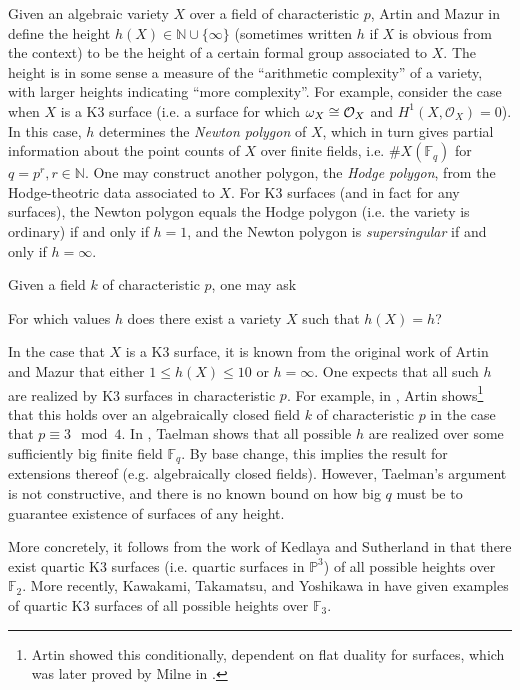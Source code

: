 Given an algebraic variety \(X\) over a field of characteristic \(p\),
Artin and Mazur in \cite{artin-mazur-1977-height}
define the height \(h(X) \in \mathbb{N} \cup \{\infty\}\) 
(sometimes written \(h\) if \(X\) is obvious from the context)
to be the height 
of a certain formal group associated to \(X\).
The height is in some sense a measure of the
``arithmetic complexity'' of a variety,
with larger heights indicating ``more complexity''.
For example, consider the case when \(X\) is a 
K3 surface (i.e. a surface for which \(\omega_{X} \cong \mathcal{O}_{X} \) 
and \(H^{1}(X,\mathcal{O}_{X} ) = 0\)).
In this case, \(h\) determines the \textit{Newton polygon}
of \(X\), which in turn gives partial information about the 
point counts of \(X\) over finite fields,
i.e. \(\#X(\mathbb{F}_{q})\) for \(q = p^{r}, r \in \mathbb{N}\).
One may construct another polygon, the \textit{Hodge polygon},
from the Hodge-theotric data associated to \(X\).
For K3 surfaces (and in fact for any surfaces), 
the Newton polygon equals the Hodge polygon
(i.e. the variety is ordinary) if and only if \(h=1\),
and the Newton polygon is \textit{supersingular} if and only if 
\(h = \infty\).

Given a field \(k\) of characteristic \(p\), one may ask

\begin{quest}
    For which values \(h\) does there exist a variety
    \(X\) such that \(h(X) = h\)?
\end{quest}

In the case that \(X\) is a K3 surface, it is known from the 
original work of Artin and Mazur
that either \(1 \leq h(X) \leq 10\) or \(h = \infty\).
One expects that all such $h$ are realized by K3 surfaces
in characteristic $p$.
For example, in \cite{artin-1974-k3-surfaces},
Artin shows\footnote{
    Artin showed this conditionally, dependent on flat
    duality for surfaces, which was later proved
    by Milne in \cite{milne-1976-flat-duality}.
}
that this holds over an algebraically
closed field \(k\) of characteristic \(p\) in the
case that \(p \equiv 3 \mod 4\).
In \cite{taelman-2016-k3-given-l-function}, 
Taelman shows that
all possible \(h\) are realized
over some sufficiently big finite field \(\mathbb{F}_{q}\). 
By base change, this implies the result for extensions
thereof (e.g. algebraically closed fields).
However, Taelman's argument is not constructive,
and there is no known bound on how big \(q\) must be to guarantee
existence of surfaces of any height.

More concretely, it follows from the work of
Kedlaya and Sutherland in 
\cite{kedlaya-sutherland-2016-census-k3-f2}
that there exist quartic K3 surfaces
(i.e. quartic surfaces in \(\mathbb{P}^{3}\))
of all possible heights over \(\mathbb{F}_{2}\).
More recently,
Kawakami, Takamatsu, and Yoshikawa in \cite{kty-2022-fedder}
have given examples of quartic K3 surfaces
of all possible heights over \(\mathbb{F}_{3}\).

